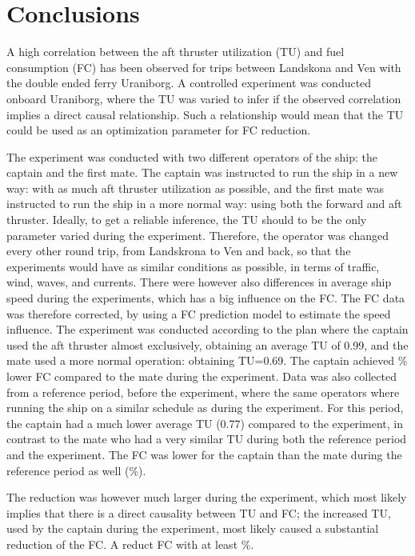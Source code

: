 \section{Conclusions}
A high correlation between the aft thruster utilization (TU) and fuel consumption (FC) has been observed for trips between Landskona and Ven with the double ended ferry Uraniborg.  A controlled experiment was conducted onboard Uraniborg, where the TU was varied to infer if the observed correlation implies a direct causal relationship. Such a relationship would mean that the TU could be used as an optimization parameter for FC reduction.

The experiment was conducted with two different operators of the ship: the captain and the first mate. The captain was instructed to run the ship in a new way: with as much aft thruster utilization as possible, and the first mate was instructed to run the ship in a more normal way: using both the forward and aft thruster.
Ideally, to get a reliable inference, the TU should to be the only parameter varied during the experiment. Therefore, the operator was changed every other round trip, from Landskrona to Ven and back, so that the experiments would have as similar conditions as possible, in terms of traffic, wind, waves, and currents.
There were however also differences in average ship speed during the experiments, which has a big influence on the FC. The FC data was therefore corrected, by using a FC prediction model to estimate the speed influence.
The experiment was conducted according to the plan where the captain used the aft thruster almost exclusively, obtaining an average TU of 0.99, and the mate used a more normal operation: obtaining TU=0.69.
The captain achieved \savingpctexperiment \% lower FC compared to the mate during the experiment.
Data was also collected from a reference period, before the experiment, where the same operators where running the ship on a similar schedule as during the experiment. For this period, the captain had a much lower average TU (0.77) compared to the experiment, in contrast to the mate who had a very similar TU during both the reference period and the experiment. The FC was lower for the captain than the mate during the reference period as well (\savingpctbeforeexperiment \%).

The reduction was however much larger during the experiment, which most likely implies that there is a direct causality between TU and FC; the increased TU, used by the captain during the experiment, most likely caused a substantial reduction of the FC. A reduct FC with at least \savingthrusterallocationpct \%.



